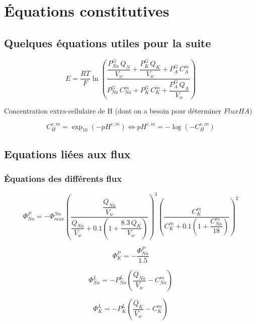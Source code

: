 \documentclass[a4paper,fleqn]{article}
\begin{document}
\section{Équations constitutives}

\subsection{Quelques équations utiles pour la suite}

\begin{equation}
E =  \frac{RT}{F}\ln{\left(\frac{\dfrac{P_{Na}^G\,Q_N}{V_w} + \dfrac{P_K^G\,Q_K}{V_w} + P_A^G\,C_A^m}{P_{Na}^G\,C_{Na}^m + P_K^G\,C_K^m + \dfrac{P_A^G\,Q_A}{V_w}}\right)}
\end{equation}

Concentration extra-cellulaire de H (dont on a besoin pour déterminer $FluxHA$)

\begin{equation}
{C_{H}^{c,m}=\exp_{10}{\left(-pH^{c,m}\right)}}\Longleftrightarrow{pH^{c,m}=-\log{\left(-C_{H}^{c,m}\right)}}
\end{equation}

\subsection{Equations liées aux flux}
\subsubsection*{Équations des différents flux}

\begin{equation}
\Phi_{Na}^{P}=-\Phi_{max}^{Na}\left(\frac{\dfrac{Q_{Na}}{V_w}}{\dfrac{Q_{Na}}{V_w} + 0.1\left(1+\dfrac{8.3\,Q_{K}}{V_w}\right)}\right)^3\left(\dfrac{C_{K}^{m}}{C_{K}^{m}+0.1\left(1+\dfrac{C_{Na}^{m}}{18}\right)}\right)^2
\end{equation}

\begin{equation}
\Phi_{K}^{P}=-\frac{\Phi_{Na}^{P}}{1.5}
\end{equation}

\begin{equation}
\Phi_{Na}^{L}=-P_{Na}^{L}\left(\frac{Q_{Na}}{V_w}-C_{Na}^{m}\right)
\end{equation}

\begin{equation}
\Phi_{K}^{L}=-P_{K}^{L}\left(\frac{Q_{K}}{V_w}-C_{K}^{m}\right)
\end{equation}
\end{document}
